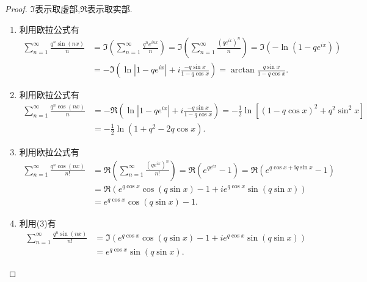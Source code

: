 \documentclass[../../main.tex]{subfiles}
\begin{document}
\begin{proof}
$\Im$表示取虚部,$\Re$表示取实部.
\begin{enumerate}[(1)]
\item 利用欧拉公式有
\begin{align*}
\sum_{n = 1}^{\infty} \frac{q^{n} \sin(nx)}{n} &= \Im\left( \sum_{n = 1}^{\infty} \frac{q^{n} e^{inx}}{n} \right) = \Im\left( \sum_{n = 1}^{\infty} \frac{(q e^{ix})^{n}}{n} \right) = \Im(-\ln(1 - q e^{ix})) \\
&= -\Im\left( \ln|1 - q e^{ix}| + i \frac{-q \sin x}{1 - q \cos x} \right) = \arctan \frac{q \sin x}{1 - q \cos x}.
\end{align*}

\item 利用欧拉公式有
\begin{align*}
\sum_{n = 1}^{\infty} \frac{q^{n} \cos(nx)}{n} &= -\Re\left( \ln|1 - q e^{ix}| + i \frac{-q \sin x}{1 - q \cos x} \right) = -\frac{1}{2} \ln\left[(1 - q \cos x)^{2} + q^{2} \sin^{2} x\right] \\
&= -\frac{1}{2} \ln(1 + q^{2} - 2q \cos x).
\end{align*}

\item 利用欧拉公式有
\begin{align*}
\sum_{n = 1}^{\infty} \frac{q^{n} \cos(nx)}{n!} &= \Re\left( \sum_{n = 1}^{\infty} \frac{(q e^{ix})^{n}}{n!} \right) = \Re\left( e^{q e^{ix}} - 1 \right) =\Re \left( e^{q\cos x+\mathrm{i}q\sin x}-1 \right) 
\\
&= \Re\left( e^{q \cos x} \cos(q \sin x) - 1 + i e^{q \cos x} \sin(q \sin x) \right) \\
&= e^{q \cos x} \cos(q \sin x) - 1.
\end{align*}

\item 利用(3)有
\begin{align*}
\sum_{n = 1}^{\infty} \frac{q^{n} \sin(nx)}{n!} &= \Im\left( e^{q \cos x} \cos(q \sin x) - 1 + i e^{q \cos x} \sin(q \sin x) \right) \\
&= e^{q \cos x} \sin(q \sin x).
\end{align*} 
\end{enumerate}
\end{proof}
\end{document}
